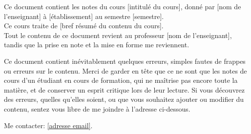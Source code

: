Ce document contient les notes du cours [intitulé du cours], donné par [nom de l'enseignant] à [établissement] au semestre [semestre]. \\
Ce cours traite de [bref résumé du contenu du cours]. \\
Tout le contenu de ce document revient au professeur [nom de l'enseignant], tandis que la prise en note et la mise en forme me reviennent.
\begin{remark}
    Ce document contient inévitablement quelques erreurs, simples
    fautes de frappes ou erreurs sur le contenu. Merci de garder en tête que ce ne sont que les notes de cours d'un étudiant en cours de formation, qui ne maîtrise pas encore toute la matière, et de conserver un esprit critique lors de leur lecture. Si vous découvrez des erreurs, quelles qu'elles soient, ou que vous souhaitez ajouter ou modifier du contenu, sentez vous libre de me joindre à l'adresse ci-dessous.
\end{remark}
Me contacter:
\href{mailto:[adresse email]}{[adresse email]}.